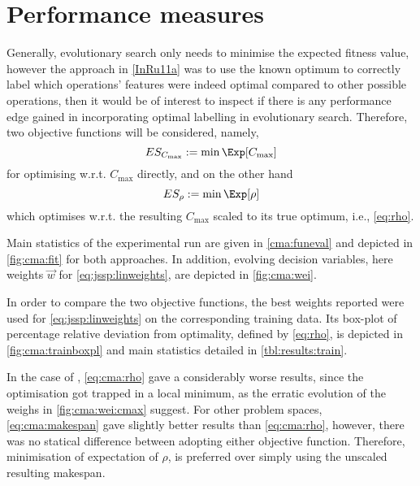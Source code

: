 \section{Performance measures}\label{sec:es:measure}
Generally, evolutionary search only needs to minimise the expected fitness 
value, however the  approach in \cref{InRu11a} was to use the known optimum to 
correctly label which operations' features were indeed optimal compared to 
other possible operations, then it would be of interest to inspect if there is 
any performance edge gained in incorporating optimal labelling in evolutionary 
search. Therefore, two objective functions will be considered, namely, 
\begin{equation}
	ES_{C_{\max}} := \min \Exp[C_{\max}] \label{eq:cma:makespan}
\end{equation}
for optimising w.r.t. $C_{\max}$ directly, and on the other hand
\begin{equation}
	ES_{\rho} := \min \Exp[\rho] \label{eq:cma:rho}
\end{equation} 
which optimises w.r.t. the resulting $C_{\max}$ scaled to its true optimum, i.e., \cref{eq:rho}.

Main statistics of the experimental run are given in \cref{cma:funeval} and depicted in \cref{fig:cma:fit} for both approaches. In addition, evolving decision variables, here weights $\vec{w}$ for \cref{eq:jssp:linweights}, are depicted in \cref{fig:cma:wei}. 

In order to compare the two objective functions, the best weights reported were used for \cref{eq:jssp:linweights} on the corresponding training data. Its box-plot of percentage relative deviation from optimality, defined by \cref{eq:rho}, is depicted in \cref{fig:cma:trainboxpl} and main statistics detailed in \cref{tbl:results:train}. 

In the case of , \cref{eq:cma:rho}  gave a considerably worse results, since the optimisation got trapped in a local minimum, as the erratic evolution of the weighs in \cref{fig:cma:wei:cmax} suggest.
For other problem spaces, \cref{eq:cma:makespan} gave slightly better results than \cref{eq:cma:rho}, however, there was no statical difference between adopting either objective function. Therefore, minimisation of expectation of $\rho$, is preferred over simply using the unscaled resulting makespan. 

